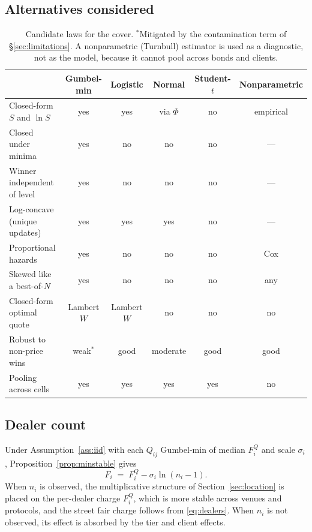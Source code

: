 \documentclass[11pt,a4paper]{article}
\theoremstyle{definition}
\theoremstyle{remark}
\begin{document}
\subsection{Alternatives considered}\label{sec:alternatives}
\begin{table}[h]
\centering
\small
\begin{tabular}{lccccc}
\toprule
 & Gumbel-min & Logistic & Normal & Student-$t$ & Nonparametric \\
\midrule
Closed-form $S$ and $\ln S$ & yes & yes & via $\Phi$ & no & empirical \\
Closed under minima & yes & no & no & no & --- \\
Winner independent of level & yes & no & no & no & --- \\
Log-concave (unique updates) & yes & yes & yes & no & --- \\
Proportional hazards & yes & no & no & no & Cox \\
Skewed like a best-of-$N$ & yes & no & no & no & any \\
Closed-form optimal quote & Lambert $W$ & Lambert $W$ & no & no & no \\
Robust to non-price wins & weak$^{*}$ & good & moderate & good & good \\
Pooling across cells & yes & yes & yes & yes & no \\
\bottomrule
\end{tabular}
\caption{Candidate laws for the cover. $^{*}$Mitigated by the contamination term of \S\ref{sec:limitations}. A nonparametric (Turnbull) estimator is used as a diagnostic, not as the model, because it cannot pool across bonds and clients.}
\label{tab:alternatives}
\end{table}

\subsection{Dealer count}\label{sec:dealers}
Under Assumption~\ref{ass:iid} with each $Q_{ij}$ Gumbel-min of median $F^Q_i$ and scale $\sigma_i$, Proposition~\ref{prop:minstable} gives
\begin{equation}\label{eq:dealers}
F_i \;=\; F^Q_i - \sigma_i\ln(n_i-1).
\end{equation}
When $n_i$ is observed, the multiplicative structure of Section~\ref{sec:location} is placed on the per-dealer charge $F^Q_i$, which is more stable across venues and protocols, and the street fair charge follows from \eqref{eq:dealers}. When $n_i$ is not observed, its effect is absorbed by the tier and client effects.
\end{document}
